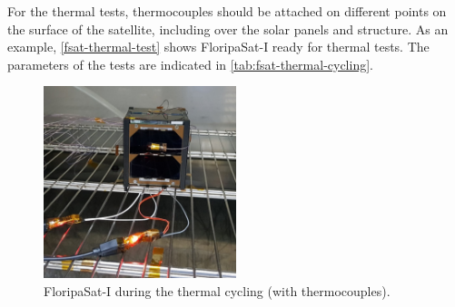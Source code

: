 For the thermal tests, thermocouples should be attached on different points on the surface of the satellite, including over the solar panels and structure. As an example, \autoref{fsat-thermal-test} shows FloripaSat-I ready for thermal tests. The parameters of the tests are indicated in \autoref{tab:fsat-thermal-cycling}.

\begin{figure}[!ht]
    \begin{center}
        \includegraphics[width=0.5\textwidth]{figures/fsat_fm_thermal_cycling.jpg}
        \caption{FloripaSat-I during the thermal cycling (with thermocouples).}
        \label{fig:fsat-thermal-test}
    \end{center}
\end{figure}

